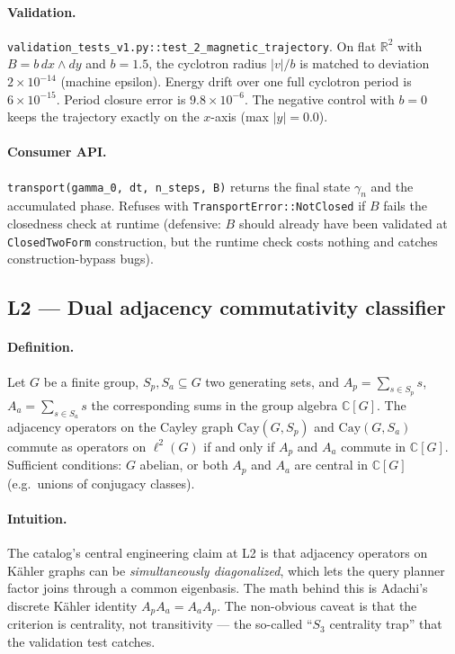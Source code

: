 \documentclass[11pt,letterpaper]{article}
\begin{document}
\paragraph{Validation.}
\texttt{validation\_tests\_v1.py::test\_2\_magnetic\_trajectory}.
On flat $\mathbb{R}^2$ with $B = b \, dx \wedge dy$ and $b = 1.5$, the
cyclotron radius $|v|/b$ is matched to deviation $2 \times 10^{-14}$
(machine epsilon). Energy drift over one full cyclotron period is
$6 \times 10^{-15}$. Period closure error is $9.8 \times 10^{-6}$.
The negative control with $b = 0$ keeps the trajectory exactly on
the $x$-axis (max $|y| = 0.0$).

\paragraph{Consumer API.}
\verb|transport(gamma_0, dt, n_steps, B)| returns the final state
$\gamma_n$ and the accumulated phase. Refuses with
\verb|TransportError::NotClosed| if $B$ fails the closedness check
at runtime (defensive: $B$ should already have been validated at
\texttt{ClosedTwoForm} construction, but the runtime check costs
nothing and catches construction-bypass bugs).


\subsection{L2 --- Dual adjacency commutativity classifier}

\paragraph{Definition.}
Let $G$ be a finite group, $S_p, S_a \subseteq G$ two generating
sets, and $A_p = \sum_{s \in S_p} s$, $A_a = \sum_{s \in S_a} s$
the corresponding sums in the group algebra $\mathbb{C}[G]$. The
adjacency operators on the Cayley graph $\mathrm{Cay}(G, S_p)$ and
$\mathrm{Cay}(G, S_a)$ commute as operators on $\ell^2(G)$ if and
only if $A_p$ and $A_a$ commute in $\mathbb{C}[G]$. Sufficient
conditions: $G$ abelian, or both $A_p$ and $A_a$ are central in
$\mathbb{C}[G]$ (e.g.\ unions of conjugacy classes).

\paragraph{Intuition.}
The catalog's central engineering claim at L2 is that adjacency
operators on K\"ahler graphs can be \emph{simultaneously
diagonalized}, which lets the query planner factor joins through a
common eigenbasis. The math behind this is Adachi's discrete
K\"ahler identity $A_p A_a = A_a A_p$. The non-obvious caveat is
that the criterion is centrality, not transitivity --- the so-called
``$S_3$ centrality trap'' that the validation test catches.
\end{document}
